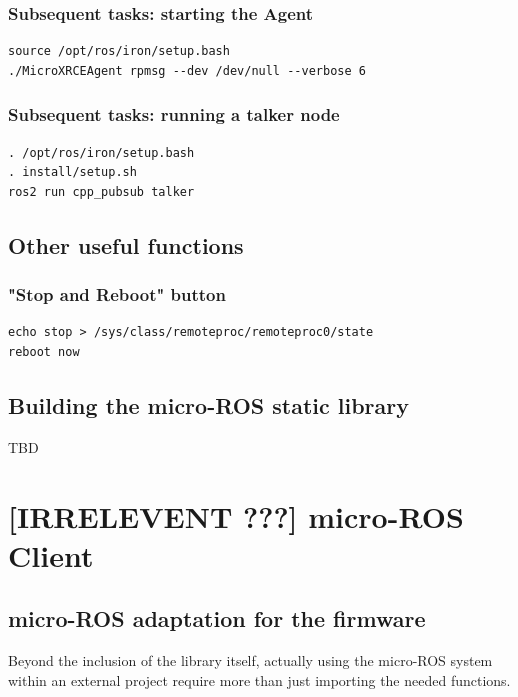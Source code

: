 \documentclass[10pt]{article}
\begin{document}
\subsubsection{Subsequent tasks: starting the Agent}
\label{sec:org0aeeb72}
\begin{verbatim}
source /opt/ros/iron/setup.bash
./MicroXRCEAgent rpmsg --dev /dev/null --verbose 6
\end{verbatim}

\subsubsection{Subsequent tasks: running a talker node}
\label{sec:org5d78d9d}
\begin{verbatim}
. /opt/ros/iron/setup.bash
. install/setup.sh
ros2 run cpp_pubsub talker
\end{verbatim}

\subsection{Other useful functions}
\label{sec:org8990298}
\subsubsection{"Stop and Reboot" button}
\label{sec:org85a06a1}
\begin{verbatim}
echo stop > /sys/class/remoteproc/remoteproc0/state
reboot now
\end{verbatim}

\subsection{Building the micro-ROS static library}
\label{sec:orgbb63612}
TBD
\clearpage
\section{[IRRELEVENT ???] micro-ROS Client}
\label{sec:orgab03d60}
\subsection{micro-ROS adaptation for the firmware}
\label{sec:org17124fa}
Beyond the inclusion of the library itself, actually using the micro-ROS system
within an external project require more than just importing the needed
functions.
\end{document}
